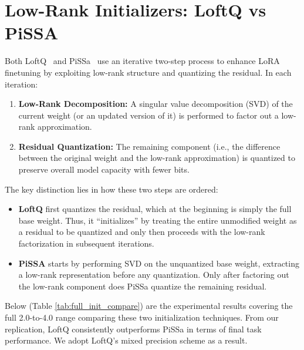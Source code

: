 
\section{Low-Rank Initializers: LoftQ vs PiSSA} \label{app:lowrankinit}
Both LoftQ~\cite{li2023loftq} and PiSSa~\cite{meng2024pissa} use an iterative two-step process to enhance LoRA finetuning by exploiting low-rank structure and quantizing the residual. In each iteration:

\begin{enumerate}
    \item \textbf{Low-Rank Decomposition:} A singular value decomposition (SVD) of the current weight (or an updated version of it) is performed to factor out a low-rank approximation.
    \item \textbf{Residual Quantization:} The remaining component (i.e., the difference between the original weight and the low-rank approximation) is quantized to preserve overall model capacity with fewer bits.
\end{enumerate}

The key distinction lies in how these two steps are ordered:
\begin{itemize}
    \item \textbf{LoftQ} first quantizes the residual, which at the beginning is simply the full base weight. Thus, it ``initializes'' by treating the entire unmodified weight as a residual to be quantized and only then proceeds with the low-rank factorization in subsequent iterations.
    \item \textbf{PiSSA} starts by performing SVD on the unquantized base weight, extracting a low-rank representation before any quantization. Only after factoring out the low-rank component does PiSSa quantize the remaining residual. 
\end{itemize}


Below (Table \ref{tab:full_init_compare}) are the experimental results covering the full 2.0-to-4.0 range comparing these two initialization techniques. From our replication, LoftQ consistently outperforms PiSSa in terms of final task performance. We adopt LoftQ's mixed precision scheme as a result.



